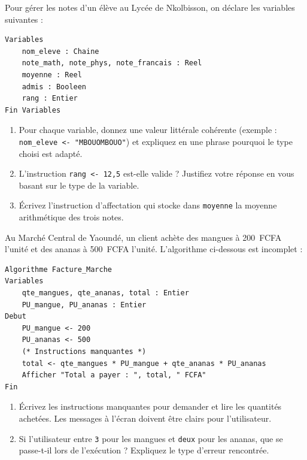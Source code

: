 \documentclass[11pt]{article}
\begin{document}
\begin{exercice}
Pour gérer les notes d'un élève au Lycée de Nkolbisson, on déclare les variables suivantes :
\begin{verbatim}
Variables
    nom_eleve : Chaine
    note_math, note_phys, note_francais : Reel
    moyenne : Reel
    admis : Booleen
    rang : Entier
Fin Variables
\end{verbatim}
\begin{enumerate}
    \item Pour chaque variable, donnez une valeur littérale cohérente (exemple : \texttt{nom\_eleve <- "MBOUOMBOUO"}) et expliquez en une phrase pourquoi le type choisi est adapté.
    \item L'instruction \texttt{rang <- 12,5} est-elle valide ? Justifiez votre réponse en vous basant sur le type de la variable.
    \item Écrivez l'instruction d'affectation qui stocke dans \texttt{moyenne} la moyenne arithmétique des trois notes.
\end{enumerate}
\end{exercice}

\begin{exercice}
Au Marché Central de Yaoundé, un client achète des mangues à \SI{200}{FCFA} l'unité et des ananas à \SI{500}{FCFA} l'unité. L'algorithme ci-dessous est incomplet :
\begin{verbatim}
Algorithme Facture_Marche
Variables
    qte_mangues, qte_ananas, total : Entier
    PU_mangue, PU_ananas : Entier
Debut
    PU_mangue <- 200
    PU_ananas <- 500
    (* Instructions manquantes *)
    total <- qte_mangues * PU_mangue + qte_ananas * PU_ananas
    Afficher "Total a payer : ", total, " FCFA"
Fin
\end{verbatim}
\begin{enumerate}
    \item Écrivez les instructions manquantes pour demander et lire les quantités achetées. Les messages à l'écran doivent être clairs pour l'utilisateur.
    \item Si l'utilisateur entre \texttt{3} pour les mangues et \texttt{deux} pour les ananas, que se passe-t-il lors de l'exécution ? Expliquez le type d'erreur rencontrée.
\end{enumerate}
\end{exercice}
\end{document}

